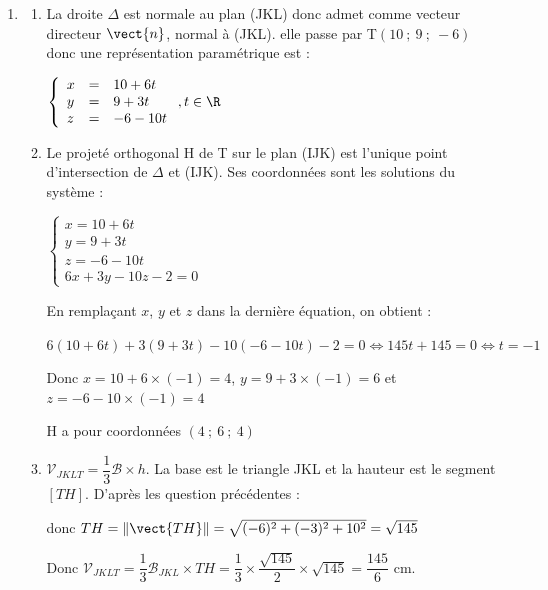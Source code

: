 \begin{enumerate}
\begin{enumerate}
Or $J\in \text{(JKL)}$ donc $12+0-10+d=0$ donc $d=-2$. Donc (JKL) a pour équation 

$6x + 3y - 10z - 2 = 0$.
	\end{enumerate}
	\item
	\begin{enumerate}
		\item La droite $\Delta$ est normale au plan (JKL) donc admet comme vecteur directeur $\vect{n}$, normal à (JKL). elle passe par T$(10~;~9~;~-6)$ donc une représentation paramétrique est :
		
$\left\{\begin{array}{l c l}	x&=&10+6t\\y &=&9+3t\\z&=&-6-10t			\end{array}\right. , t \in \R$
		\item Le projeté orthogonal H de T sur le plan (IJK) est l'unique point d'intersection de $\Delta$ et (IJK). Ses coordonnées sont les solutions du système :

$\left\{\begin{array}{l}	x=10+6t\\y =9+3t\\z=-6-10t\\6x+3y-10z-2=0			\end{array}\right.$

En remplaçant $x$, $y$ et $z$ dans la dernière équation, on obtient :

$6(10+6t)+3(9+3t)-10(-6-10t)-2=0 \iff 145t+145=0 \iff t=-1$

Donc $x=10+6\times(-1)=4$, $y=9+3\times(-1)=6$ et $z=-6-10\times(-1)=4$

H a pour coordonnées $(4~;~6~;~4)$
\item $\mathcal{V}_{JKLT}  = \dfrac13 \mathcal{B} \times h$. La base est le triangle JKL et la hauteur est le segment $[TH]$. D'après les question précédentes :

 donc $TH= \left\|\vect{TH}\right\| = \sqrt{(-6)^2+(-3)^2+10^2}=\sqrt{145}$

Donc $\mathcal{V}_{JKLT}  = \dfrac13 \mathcal{B}_{JKL} \times TH=\dfrac13 \times \dfrac{\sqrt{145}}{2} \times \sqrt{145}= \dfrac{145}{6} $ cm.
	\end{enumerate}

\end{enumerate}
\bigskip

